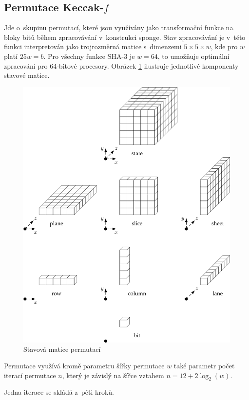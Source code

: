 \documentclass[titlepage,a4paper,12pt]{article}
\begin{document}
\subsection{Permutace Keccak-\(f\)}

Jde o~skupinu permutací, které jsou využívány jako transformační funkce na bloky bitů během zpracovávání v~konstrukci sponge. Stav zpracovávání je v~této funkci interpretován jako trojrozměrná matice s~dimenzemi \(5 \times 5 \times w\), kde pro \(w\) platí \(25w = b\). Pro všechny funkce SHA-3 je \(w = 64\), to umožňuje optimální zpracování pro 64-bitové procesory. Obrázek \ref{fig:state} ilustruje jednotlivé komponenty stavové matice. \par

\begin{figure}[ht!]
\centering
\includegraphics[scale=0.5]{state.png}
\caption{Stavová matice permutací}
\label{fig:state}
\end{figure}

Permutace využívá kromě parametru šířky permutace \(w\) také parametr počet iterací permutace \(n\), který je závislý na šířce vztahem \(n = 12 + 2\log_2(w)\). \par
Jedna iterace se skládá z~pěti kroků.
\end{document}
